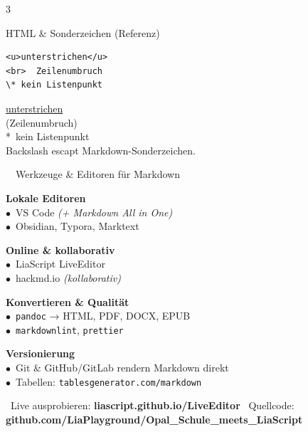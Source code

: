 \documentclass[a4paper,landscape,9pt]{extarticle}
\newcommand{\prevtxt}[1]{{\small #1}}
\begin{document}
\begin{multicols}{3}
\begin{mdcard}{HTML \& Sonderzeichen (Referenz)}
\begin{lstlisting}[language=lia]
<u>unterstrichen</u>
<br>  Zeilenumbruch
\* kein Listenpunkt
\end{lstlisting}
\tcblower
\prevtxt{\underline{unterstrichen}\\
{\scriptsize\color{muted}(Zeilenumbruch)}\\
*~kein Listenpunkt\\[2pt]
{\scriptsize\color{muted}Backslash escapt Markdown-Sonderzeichen.}}
\end{mdcard}

\end{multicols}

\noindent
\begin{mdinfo}{\faToolbox~~Werkzeuge \& Editoren für Markdown}
\footnotesize
\begin{minipage}[t]{0.24\linewidth}
\textbf{\color{mdblue}Lokale Editoren}\\[1pt]
$\bullet$~VS Code \textit{(+ Markdown All in One)}\\
$\bullet$~Obsidian, Typora, Marktext
\end{minipage}\hfill
\begin{minipage}[t]{0.22\linewidth}
\textbf{\color{mdblue}Online \& kollaborativ}\\[1pt]
$\bullet$~LiaScript LiveEditor\\
$\bullet$~hackmd.io \textit{(kollaborativ)}
\end{minipage}\hfill
\begin{minipage}[t]{0.24\linewidth}
\textbf{\color{mdblue}Konvertieren \& Qualität}\\[1pt]
$\bullet$~\texttt{pandoc} → HTML, PDF, DOCX, EPUB\\
$\bullet$~\texttt{markdownlint}, \texttt{prettier}
\end{minipage}\hfill
\begin{minipage}[t]{0.25\linewidth}
\textbf{\color{mdblue}Versionierung}\\[1pt]
$\bullet$~Git \& GitHub/GitLab rendern Markdown direkt\\
$\bullet$~Tabellen: \texttt{tablesgenerator.com/markdown}
\end{minipage}
\end{mdinfo}

\vfill
{\sffamily\scriptsize\color{muted}
\faInfoCircle~Live ausprobieren: \textbf{liascript.github.io/LiveEditor}\hfill
\faGithub~Quellcode: \textbf{github.com/LiaPlayground/Opal\_Schule\_meets\_LiaScript}}
\end{document}
